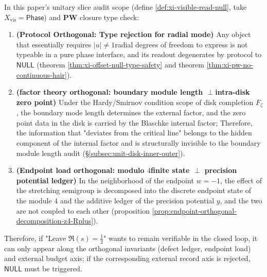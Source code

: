 \begin{theorem}\label{thm:xi-orthogonal-slice-structure}
In this paper’s unitary slice audit scope (define \ref{def:xi-visible-read-null}, take \(X_{\mathrm{vis}}=\mathsf{Phase}\)) and \(\mathbf{PW}\) closure type check:
\begin{enumerate}
  \item ​​\textbf{(Protocol Orthogonal: Type rejection for radial mode)}
  Any object that essentially requires \(|u|\neq 1\) ​​radial degrees of freedom to express is not typeable in a pure phase interface, and its readout degenerates by protocol to \(\mathsf{NULL}\) (theorem \ref{thm:xi-offset-null-type-safety} and theorem \ref{thm:xi-pw-no-continuous-hair}).
  \item \textbf{(factor theory orthogonal: boundary module length \(\perp\) ​​intra-disk zero point)}
  Under the Hardy/Smirnov condition scope of disk completion \(F_\zeta\), the boundary mode length determines the external factor, and the zero point data in the disk is carried by the Blaschke internal factor;
  Therefore, the information that "deviates from the critical line" belongs to the hidden component of the internal factor and is structurally invisible to the boundary module length audit (\S\ref{subsec:unit-disk-inner-outer}).
  \item \textbf{(Endpoint load orthogonal: modulo \(4\) ​​finite state \(\perp\) precision potential ledger)}
  In the neighborhood of the endpoint \(w=-1\), the effect of the stretching semigroup is decomposed into the discrete endpoint state of the module \(4\) and the additive ledger of the precision potential \(y\), and the two are not coupled to each other (proposition \ref{prop:endpoint-orthogonal-decomposition-z4-Rplus}).
\end{enumerate}
Therefore, if "Leave \(\Re(s)=\tfrac12\)" wants to remain verifiable in the closed loop, it can only appear along the orthogonal invariants (defect ledger, endpoint load) and external budget axis; if the corresponding external record axis is rejected, \(\mathsf{NULL}\) must be triggered.
\end{theorem}
